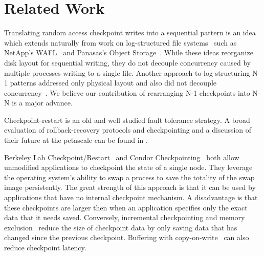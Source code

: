\section{Related Work}
\label{related}




Translating random access checkpoint writes into a sequential pattern is an
idea which extends naturally from work on log-structured file
systems~\cite{lfs} such as NetApp's WAFL~\cite{WAFL} and Panasas's Object
Storage~\cite{welch08scalableperformance}. While these ideas reorganize disk
layout for sequential writing, they do not decouple concurrency caused by
multiple processes writing to a single file.  Another approach to
log-structuring N-1 patterns addressed only physical layout and also did not
decouple concurrency~\cite{pvfs-log}.  We believe our contribution of
rearranging N-1 checkpoints into N-N is a major advance. 

Checkpoint-restart is an old and well studied fault tolerance strategy. A broad
evaluation of rollback-recovery protocols and checkpointing and a discussion of
their future at the petascale can be found in \cite{survey1, survey2}.  

Berkeley Lab Checkpoint/Restart~\cite{blcr} and Condor
Checkpointing~\cite{condor-ckpt} both allow unmodified applications to
checkpoint the state of a single node.  They leverage the operating system's
ability to swap a process to save the totality of the swap image persistently.
The great strength of this approach is that it can be used by applications that
have no internal checkpoint mechanism.  A disadvantage is that these
checkpoints are larger then when an application specifies only the exact data
that it needs saved.
Conversely, incremental checkpointing and memory
exclusion~\cite{pcl:99:me,pxn:95:scd} reduce the size of checkpoint data by
only saving data that has changed since the previous checkpoint.  Buffering
with copy-on-write~\cite{li-298215} can also reduce checkpoint latency.

